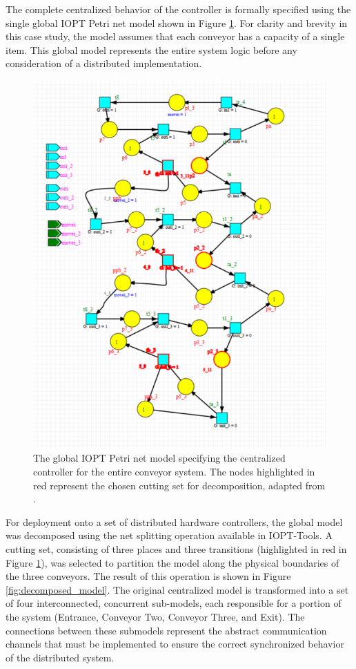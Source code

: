 The complete centralized behavior of the controller is formally specified using the single global IOPT Petri net model shown in Figure \ref{fig:global_model}. For clarity and brevity in this case study, the model assumes that each conveyor has a capacity of a single item. This global model represents the entire system logic before any consideration of a distributed implementation.

\begin{figure}[htb]
    \centering
    \includegraphics[width=0.95\columnwidth]{Chapters/Figures/modeloglobalcomcuttingset.png}
    \caption{The global IOPT Petri net model specifying the centralized controller for the entire conveyor system. The nodes highlighted in red represent the chosen cutting set for decomposition, adapted from \cite{tavaresgomes2026}.}
    \label{fig:global_model}
\end{figure}

For deployment onto a set of distributed hardware controllers, the global model was decomposed using the net splitting operation available in IOPT-Tools. A cutting set, consisting of three places and three transitions (highlighted in red in Figure \ref{fig:global_model}), was selected to partition the model along the physical boundaries of the three conveyors. The result of this operation is shown in Figure \ref{fig:decomposed_model}. The original centralized model is transformed into a set of four interconnected, concurrent sub-models, each responsible for a portion of the system (Entrance, Conveyor Two, Conveyor Three, and Exit). The connections between these submodels represent the abstract communication channels that must be implemented to ensure the correct synchronized behavior of the distributed system.

